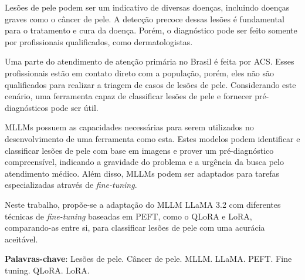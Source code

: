 \imprimircapa

\imprimirfolhaderosto*

\begin{fichacatalografica}
	
\end{fichacatalografica}





\setlength{\absparsep}{18pt}
\begin{resumo}
	\SingleSpacing
	Lesões de pele podem ser um indicativo de diversas doenças, incluindo doenças graves como o câncer de pele. A detecção precoce dessas lesões é fundamental para o
	tratamento e cura da doença. Porém, o diagnóstico pode ser feito somente por profissionais qualificados, como dermatologistas.
	
	Uma parte do atendimento de atenção primária no Brasil é feita por \ac{ACS}. Esses profissionais estão em contato direto com a população, porém, eles não são
	qualificados para realizar a triagem de casos de lesões de pele. Considerando este cenário, uma ferramenta capaz de classificar lesões de pele e fornecer
	pré-diagnósticos pode ser útil.
	
	\acp{MLLM} possuem as capacidades necessárias para serem utilizados no desenvolvimento de uma ferramenta como esta. Estes modelos podem identificar e classificar
	lesões de pele com base em imagens e prover um pré-diagnóstico compreensível, indicando a gravidade do problema e a urgência da busca pelo atendimento médico. Além
	disso, \acp{MLLM} podem ser adaptados para tarefas especializadas através de \textit{fine-tuning}.
	
	Neste trabalho, propõe-se a adaptação do \ac{MLLM} \ac{LLaMA} 3.2 com diferentes técnicas de \textit{fine-tuning} baseadas em \ac{PEFT}, como o \ac{QLoRA} e
	\ac{LoRA}, comparando-as entre si, para classificar lesões de pele com uma acurácia aceitável.

	\textbf{Palavras-chave}: Lesões de pele. Câncer de pele. MLLM. LLaMA. PEFT. Fine tuning. QLoRA. LoRA.
\end{resumo}

